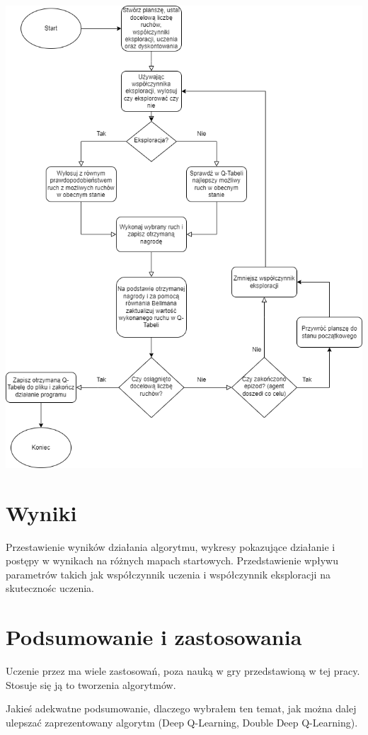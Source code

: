\documentclass[a4paper,12pt]{article}
\begin{document}
\includegraphics[scale=0.6]{flowchart.png}

\section{Wyniki}

Przestawienie wyników działania algorytmu, wykresy pokazujące działanie i postępy w wynikach na różnych mapach startowych. Przedstawienie wpływu parametrów takich jak współczynnik uczenia i współczynnik eksploracji na skutecznośc uczenia.

\section{Podsumowanie i zastosowania}

Uczenie przez ma wiele zastosowań, poza nauką w gry przedstawioną w tej pracy. Stosuje się ją to tworzenia algorytmów.

 Jakieś adekwatne podsumowanie, dlaczego wybrałem ten temat, jak można dalej ulepszać zaprezentowany algorytm (Deep Q-Learning, Double Deep Q-Learning).
\end{document}
